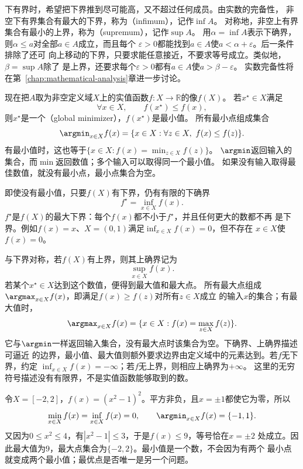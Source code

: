下有界时，希望把下界推到尽可能高，又不超过任何成员。由实数的完备性，
非空下有界集合有最大的下界，称为（infimum），记作$\inf A$。
对称地，非空上有界集合有最小的上界，称为（supremum），记作$\sup A$。
用$\alpha=\inf A$表示下确界，则$\alpha\leq a$对全部$a\in A$成立，而且每个
$\varepsilon>0$都能找到$a\in A$使$a<\alpha+\varepsilon$。后一条件排除了还可
向上移动的下界，只要求能任意接近，不要求等号成立。类似地，$\beta=\sup A$除了
是上界，还要求每个$\varepsilon>0$都有$a\in A$使$a>\beta-\varepsilon$。
实数完备性将在第~\ref{chap:mathematical-analysis}章进一步讨论。

现在把$A$取为非空定义域$X$上的实值函数$f:X\to\mathbb{R}$的像$f(X)$。
若$x^\star\in X$满足
\[
  \forall x\in X,\qquad f(x^\star)\leq f(x),
\]
则$x^\star$是一个（global minimizer），$f(x^\star)$是最小值。
所有最小点组成集合
\[
  \argmin_{x\in X} f(x)
  =\{x\in X:\forall z\in X,\ f(x)\leq f(z)\}.
\]
有最小值时，这也等于$\{x\in X:f(x)=\min_{z\in X}f(z)\}$。
$\argmin$返回输入的集合，而$\min$返回数值；多个输入可以取得同一个最小值。
如果没有输入取得最佳数值，就没有最小点，最小点集合为空。

即使没有最小值，只要$f(X)$有下界，仍有有限的下确界
\[
  f^\star=\inf_{x\in X}f(x).
\]
$f^\star$是$f(X)$的最大下界：每个$f(x)$都不小于$f^\star$，并且任何更大的数都不再
是下界。例如$f(x)=x$、$X=(0,1)$满足$\inf_{x\in X}f(x)=0$，但不存在
$x\in X$使$f(x)=0$。

与下界对称，若$f(X)$有上界，则其上确界记为
\[
  \sup_{x\in X}f(x).
\]
若某个$x^\star\in X$达到这个数值，便得到最大值和最大点。
所有最大点组成$\argmax_{x\in X}f(x)$，即满足$f(x)\geq f(z)$对所有$z\in X$成立
的输入$x$的集合；有最大值时，
\[
  \argmax_{x\in X}f(x)
  =\{x\in X:f(x)=\max_{z\in X}f(z)\}.
\]
它与$\argmin$一样返回输入集合，没有最大点时该集合为空。下确界、上确界描述可逼近
的边界，最小值、最大值则额外要求边界由定义域中的元素达到。若$f$无下界，约定
$\inf_{x\in X}f(x)=-\infty$；若$f$无上界，则相应上确界为$+\infty$。
这里的无穷符号描述没有有限界，不是实值函数能够取到的数。

\begin{example}[同一个最优值可以对应多个输入]
\label{ex:prelim-optimal-value-versus-points}
令$X=[-2,2]$，$f(x)=(x^2-1)^2$。平方非负，且$x=\pm1$都使它为零，所以
\[
  \min_{x\in X}f(x)=\inf_{x\in X}f(x)=0,\qquad
  \argmin_{x\in X}f(x)=\{-1,1\}.
\]
又因为$0\leq x^2\leq4$，有$|x^2-1|\leq3$，于是$f(x)\leq9$，等号恰在$x=\pm2$
处成立。因此最大值为$9$，最大点集合为$\{-2,2\}$。最小值是一个数，不会因为有两个
最小点就变成两个最小值；最优点是否唯一是另一个问题。
\end{example}

